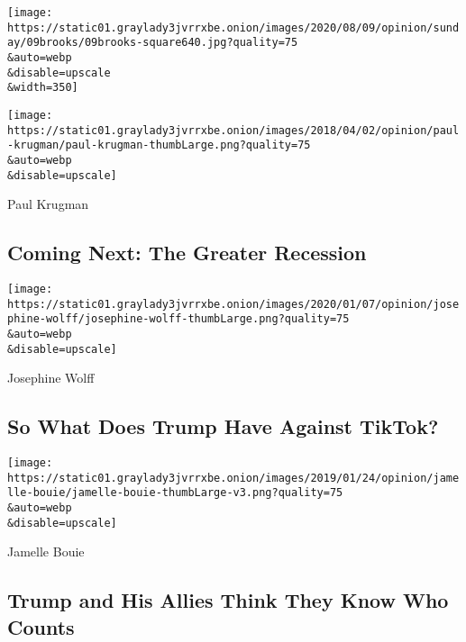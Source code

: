 \href{/2020/08/07/opinion/sunday/republican-party-trump-2020.html}{}

\texttt{[image: https://static01.graylady3jvrrxbe.onion/images/2020/08/09/opinion/sunday/09brooks/09brooks-square640.jpg?quality=75\\\&auto=webp\\\&disable=upscale\\\&width=350]}

\href{/2020/08/06/opinion/coronavirus-us-recession.html}{}

\texttt{[image: https://static01.graylady3jvrrxbe.onion/images/2018/04/02/opinion/paul-krugman/paul-krugman-thumbLarge.png?quality=75\\\&auto=webp\\\&disable=upscale]}

Paul Krugman

\hypertarget{coming-next-the-greater-recession}{%
\subsection{Coming Next: The Greater
Recession}\label{coming-next-the-greater-recession}}

\href{/2020/08/07/opinion/tiktok-wechat-china-trump-executive-order.html}{}

\texttt{[image: https://static01.graylady3jvrrxbe.onion/images/2020/01/07/opinion/josephine-wolff/josephine-wolff-thumbLarge.png?quality=75\\\&auto=webp\\\&disable=upscale]}

Josephine Wolff

\hypertarget{so-what-does-trump-have-against-tiktok}{%
\subsection{So What Does Trump Have Against
TikTok?}\label{so-what-does-trump-have-against-tiktok}}

\href{/2020/08/07/opinion/trump-2020-census.html}{}

\texttt{[image: https://static01.graylady3jvrrxbe.onion/images/2019/01/24/opinion/jamelle-bouie/jamelle-bouie-thumbLarge-v3.png?quality=75\\\&auto=webp\\\&disable=upscale]}

Jamelle Bouie

\hypertarget{trump-and-his-allies-think-they-know-who-counts}{%
\subsection{Trump and His Allies Think They Know Who
Counts}\label{trump-and-his-allies-think-they-know-who-counts}}

\href{/2020/08/06/opinion/hiroshima-anniversary-nuclear-weapons.html}{}


